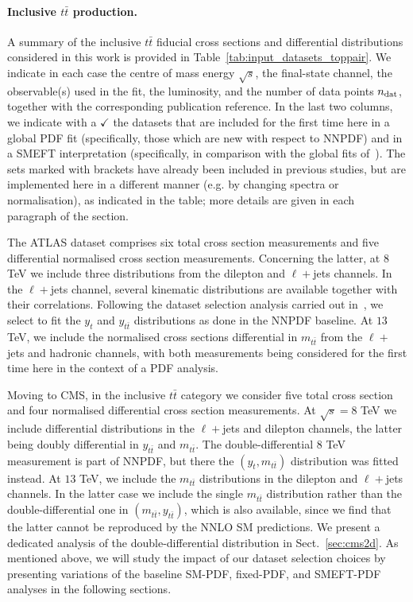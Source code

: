 \documentclass[withindex,glossary]{cam-thesis}
\begin{document}
\paragraph{Inclusive $t\bar{t}$ production.}
A summary of the inclusive $t\bar{t}$ fiducial cross sections
and differential distributions considered in this work is provided
in Table~\ref{tab:input_datasets_toppair}.
%
We indicate in each case
 the centre of mass energy $\sqrt{s}$, the final-state
 channel, the observable(s) used in the fit, the luminosity, and the
 number of data points $n_{\rm dat}$, together
 with the corresponding publication reference.
 In the last two columns, we indicate
 with a $\checkmark$ the datasets
 that are included for the first time here in a global PDF fit (specifically, those which
 are new with respect to NNPDF)
 and in a SMEFT interpretation (specifically, in comparison
 with the global fits of~\cite{Ellis:2020unq,Ethier:2021bye}).
 The sets marked with brackets have already been included in
 previous studies, but are implemented here in a different manner
 (e.g. by changing spectra or normalisation), as indicated in the
 table; more details are given in each paragraph of the section. 

 The ATLAS dataset comprises six total cross section measurements
 and five differential normalised cross section measurements.
 Concerning the latter, at $8$ TeV we include three distributions
 from the dilepton and $\ell+$jets channels.
%
 In the $\ell+$jets channel, several kinematic distributions are available
 together with their correlations.
 Following the dataset selection analysis carried out in~\cite{NNPDF:2021njg},
 we select to fit the $y_t$ and $y_{t\bar{t}}$ distributions as done in the
 NNPDF baseline.
%
 At $13$ TeV, we include the normalised cross sections
 differential in $m_{t\bar{t}}$ from the $\ell+$jets 
 and  hadronic channels, with both measurements being considered
 for the first time here in the context of a PDF analysis.

 Moving to CMS, in the inclusive $t\bar{t}$ category
 we consider five total cross section  and four normalised differential cross section
 measurements.
%
 At $\sqrt{s}=8$ TeV we include differential distributions in the 
 $\ell+$jets and dilepton channels, the latter being doubly differential
 in $y_{t\bar{t}}$ and $m_{t\bar{t}}$.
 The double-differential 8 TeV measurement is part of NNPDF, but there
 the $(y_{t},m_{t\bar{t}})$ distribution was fitted instead.
%
 At $13$ TeV, we include the $m_{t\bar{t}}$  distributions
 in the dilepton and $\ell+$jets channels.
 In the latter case we  include the single $m_{t\bar{t}}$ distribution
 rather than the double-differential one in $(m_{t\bar{t}},
 y_{t\bar{t}})$, which is also available, since we find that the
 latter cannot be reproduced by the NNLO SM predictions. We present a
 dedicated analysis of the double-differential distribution in Sect.~\ref{sec:cms2d}.
 As mentioned above, we will study the impact of our dataset selection choices
 by presenting variations of the baseline SM-PDF, fixed-PDF, and SMEFT-PDF analyses
 in the following sections.
\end{document}
